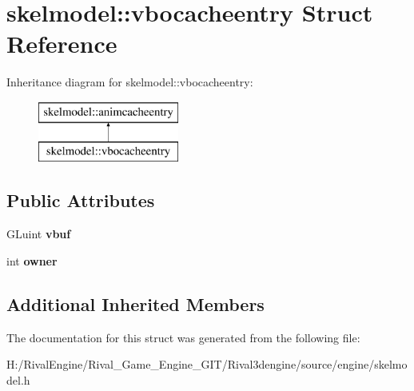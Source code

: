 \hypertarget{structskelmodel_1_1vbocacheentry}{}\section{skelmodel\+:\+:vbocacheentry Struct Reference}
\label{structskelmodel_1_1vbocacheentry}
Inheritance diagram for skelmodel\+:\+:vbocacheentry\+:\begin{figure}[H]
\begin{center}
\leavevmode
\includegraphics[height=2.000000cm]{structskelmodel_1_1vbocacheentry}
\end{center}
\end{figure}
\subsection*{Public Attributes}
\begin{DoxyCompactItemize}
\item 
\mbox{\label{structskelmodel_1_1vbocacheentry_ac47a4fcd0c43f9a643bf010c29d6479c}} 
G\+Luint {\bfseries vbuf}
\item 
\mbox{\label{structskelmodel_1_1vbocacheentry_a447ff81ddf09a61680b480a38da0b365}} 
int {\bfseries owner}
\end{DoxyCompactItemize}
\subsection*{Additional Inherited Members}


The documentation for this struct was generated from the following file\+:\begin{DoxyCompactItemize}
\item 
H\+:/\+Rival\+Engine/\+Rival\+\_\+\+Game\+\_\+\+Engine\+\_\+\+G\+I\+T/\+Rival3dengine/source/engine/skelmodel.\+h\end{DoxyCompactItemize}
